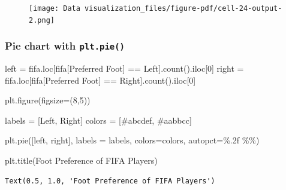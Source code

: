 \documentclass[
  letterpaper,
  DIV=11,
  numbers=noendperiod]{scrreprt}
\newenvironment{Shaded}{\begin{snugshade}}{\end{snugshade}}
\newcommand{\DecValTok}[1]{\textcolor[rgb]{0.68,0.00,0.00}{#1}}
\newcommand{\NormalTok}[1]{\textcolor[rgb]{0.00,0.23,0.31}{#1}}
\newcommand{\OperatorTok}[1]{\textcolor[rgb]{0.37,0.37,0.37}{#1}}
\newcommand{\SpecialCharTok}[1]{\textcolor[rgb]{0.37,0.37,0.37}{#1}}
\newcommand{\StringTok}[1]{\textcolor[rgb]{0.13,0.47,0.30}{#1}}
\begin{document}
\begin{figure}[H]

{\centering \texttt{[image: Data visualization\_files/figure-pdf/cell-24-output-2.png]}

}

\end{figure}

\hypertarget{pie-chart-with-plt.pie}{%
\subsubsection{\texorpdfstring{Pie chart with
\texttt{plt.pie()}}{Pie chart with plt.pie()}}\label{pie-chart-with-plt.pie}}

\begin{Shaded}
\begin{Highlighting}[]
\NormalTok{left }\OperatorTok{=}\NormalTok{ fifa.loc[fifa[}\StringTok{\textquotesingle{}Preferred Foot\textquotesingle{}}\NormalTok{] }\OperatorTok{==} \StringTok{\textquotesingle{}Left\textquotesingle{}}\NormalTok{].count().iloc[}\DecValTok{0}\NormalTok{]}
\NormalTok{right }\OperatorTok{=}\NormalTok{ fifa.loc[fifa[}\StringTok{\textquotesingle{}Preferred Foot\textquotesingle{}}\NormalTok{] }\OperatorTok{==} \StringTok{\textquotesingle{}Right\textquotesingle{}}\NormalTok{].count().iloc[}\DecValTok{0}\NormalTok{]}

\NormalTok{plt.figure(figsize}\OperatorTok{=}\NormalTok{(}\DecValTok{8}\NormalTok{,}\DecValTok{5}\NormalTok{))}

\NormalTok{labels }\OperatorTok{=}\NormalTok{ [}\StringTok{\textquotesingle{}Left\textquotesingle{}}\NormalTok{, }\StringTok{\textquotesingle{}Right\textquotesingle{}}\NormalTok{]}
\NormalTok{colors }\OperatorTok{=}\NormalTok{ [}\StringTok{\textquotesingle{}\#abcdef\textquotesingle{}}\NormalTok{, }\StringTok{\textquotesingle{}\#aabbcc\textquotesingle{}}\NormalTok{]}

\NormalTok{plt.pie([left, right], labels }\OperatorTok{=}\NormalTok{ labels, colors}\OperatorTok{=}\NormalTok{colors, autopct}\OperatorTok{=}\StringTok{\textquotesingle{}}\SpecialCharTok{\%.2f}\StringTok{ }\SpecialCharTok{\%\%}\StringTok{\textquotesingle{}}\NormalTok{)}

\NormalTok{plt.title(}\StringTok{\textquotesingle{}Foot Preference of FIFA Players\textquotesingle{}}\NormalTok{)}
\end{Highlighting}
\end{Shaded}

\begin{verbatim}
Text(0.5, 1.0, 'Foot Preference of FIFA Players')
\end{verbatim}
\end{document}
